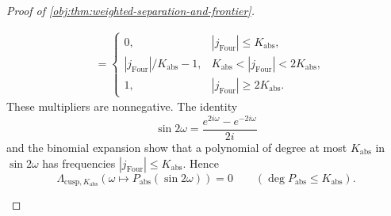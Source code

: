 \begin{proof}[Proof of \cref{obj:thm:weighted-separation-and-frontier}]
\begin{enumerate}
\[\begin{aligned}
&=\begin{cases}
0,&|j_{\mathrm{Four}}|\le K_{\mathrm{abs}},\\
|j_{\mathrm{Four}}|/K_{\mathrm{abs}}-1,
&K_{\mathrm{abs}}<|j_{\mathrm{Four}}|<2K_{\mathrm{abs}},\\
1,&|j_{\mathrm{Four}}|\ge2K_{\mathrm{abs}}.
\end{cases}
\end{aligned}
\]
These multipliers are nonnegative. The identity
\[
\sin2\omega=\frac{e^{2i\omega}-e^{-2i\omega}}{2i}
\]
and the binomial expansion show that a polynomial of degree at most
\(K_{\mathrm{abs}}\) in \(\sin2\omega\) has frequencies
\(|j_{\mathrm{Four}}|\le K_{\mathrm{abs}}\). Hence
\[
\Lambda_{\mathrm{cusp},K_{\mathrm{abs}}}
 (\omega\mapsto P_{\mathrm{abs}}(\sin2\omega))=0
\qquad(\deg P_{\mathrm{abs}}\le K_{\mathrm{abs}}).
\]


\end{enumerate}
\end{proof}
